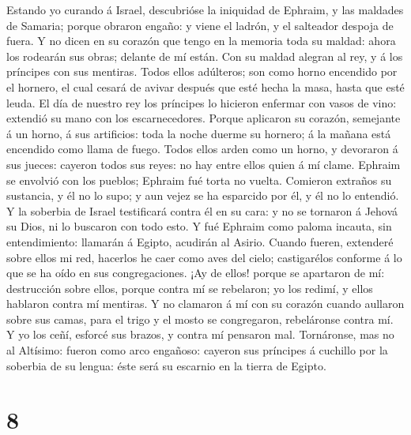  Estando yo curando á Israel, descubrióse la iniquidad de
Ephraim, y las maldades de Samaria; porque obraron engaño: y viene el
ladrón, y el salteador despoja de fuera.  Y no dicen en su
corazón que tengo en la memoria toda su maldad: ahora los rodearán sus
obras; delante de mí están.  Con su maldad alegran al rey,
y á los príncipes con sus mentiras.  Todos ellos
adúlteros; son como horno encendido por el hornero, el cual cesará de
avivar después que esté hecha la masa, hasta que esté leuda.
 El día de nuestro rey los príncipes lo hicieron enfermar
con vasos de vino: extendió su mano con los escarnecedores.
 Porque aplicaron su corazón, semejante á un horno, á sus
artificios: toda la noche duerme su hornero; á la mañana está encendido
como llama de fuego.  Todos ellos arden como un horno, y
devoraron á sus jueces: cayeron todos sus reyes: no hay entre ellos
quien á mí clame.  Ephraim se envolvió con los pueblos;
Ephraim fué torta no vuelta.  Comieron extraños su
sustancia, y él no lo supo; y aun vejez se ha esparcido por él, y él no
lo entendió.  Y la soberbia de Israel testificará contra
él en su cara: y no se tornaron á Jehová su Dios, ni lo buscaron con
todo esto.  Y fué Ephraim como paloma incauta, sin
entendimiento: llamarán á Egipto, acudirán al Asirio. 
Cuando fueren, extenderé sobre ellos mi red, hacerlos he caer como aves
del cielo; castigarélos conforme á lo que se ha oído en sus
congregaciones.  ¡Ay de ellos! porque se apartaron de mí:
destrucción sobre ellos, porque contra mí se rebelaron; yo los redimí, y
ellos hablaron contra mí mentiras.  Y no clamaron á mí
con su corazón cuando aullaron sobre sus camas, para el trigo y el mosto
se congregaron, rebeláronse contra mí.  Y yo los ceñí,
esforcé sus brazos, y contra mí pensaron mal. 
Tornáronse, mas no al Altísimo: fueron como arco engañoso: cayeron sus
príncipes á cuchillo por la soberbia de su lengua: éste será su escarnio
en la tierra de Egipto.

\hypertarget{section-7}{%
\section{8}\label{section-7}}

